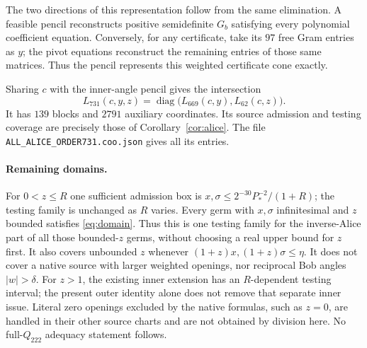 \documentclass[11pt]{article}
\begin{document}
The two directions of this representation follow from the same elimination.
A feasible pencil reconstructs positive semidefinite $G_b$ satisfying every
polynomial coefficient equation. Conversely, for any certificate, take its
$97$ free Gram entries as $y$; the pivot equations reconstruct the remaining
entries of those same matrices. Thus the pencil represents this weighted
certificate cone exactly.

Sharing $c$ with the inner-angle pencil gives the intersection
\[
 L_{731}(c,y,z)=\operatorname{diag}\bigl(L_{669}(c,y),L_{62}(c,z)\bigr).
\]
It has $139$ blocks and $2791$ auxiliary coordinates. Its source admission
and testing coverage are precisely those of Corollary~\ref{cor:alice}.
The file \texttt{ALL\_ALICE\_ORDER731.coo.json} gives all its entries.

\paragraph{Remaining domains.}
For $0<z\le R$ one sufficient admission box is
$x,\sigma\le2^{-30}P_*^{-2}/(1+R)$; the testing family is unchanged
as $R$ varies. Every germ with $x,\sigma$ infinitesimal and $z$
bounded satisfies \eqref{eq:domain}. Thus this is one testing family
for the inverse-Alice part of all those bounded-$z$ germs, without
choosing a real upper bound for $z$ first. It also covers unbounded
$z$ whenever $(1+z)x,(1+z)\sigma\le\eta$.
It does not cover a native source with larger weighted openings,
nor reciprocal Bob angles $|w|>\delta$. For $z>1$, the existing
inner extension has an $R$-dependent testing interval; the present
outer identity alone does not remove that separate inner issue.
Literal zero openings excluded by the native formulas, such as $z=0$, are handled
in their other source charts and are not obtained by division here.
No full-$Q_{222}$ adequacy statement follows.
\end{document}
